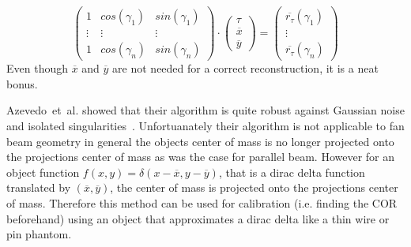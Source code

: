 \documentclass[10pt,journal,compsoc]{IEEEtran}
\begin{document}
\begin{equation}
\begin{pmatrix}
1 & cos(\gamma_1) & sin(\gamma_1) \\
\vdots & \vdots & \vdots \\
1 & cos(\gamma_n) & sin(\gamma_n) 
\end{pmatrix}
\cdot
\begin{pmatrix}
\tau \\
\overline{x} \\
\overline{y}
\end{pmatrix}
=
\begin{pmatrix}
\overline{r_\tau}(\gamma_1) \\
\vdots \\
\overline{r_\tau}(\gamma_n)
\end{pmatrix}
\end{equation}
%
Even though $\overline{x}$ and $\overline{y}$ are not needed for a correct reconstruction, it is a neat bonus.

Azevedo~et~al. showed that their algorithm is quite robust against Gaussian noise and isolated singularities~\cite{azevedo90}.
Unfortuanately their algorithm is not applicable to fan beam geometry in general the objects center of mass is no longer projected onto the projections center of mass as was the case for parallel beam.
However for an object function $f(x,y) = \delta(x-\overline{x}, y-\overline{y})$, that is a dirac delta function translated by $(\overline{x},\overline{y})$, the center of mass is projected onto the projections center of mass.
Therefore this method can be used for calibration (i.e. finding the COR beforehand) using an object that approximates a dirac delta like a thin wire or pin phantom. 
\end{document}
